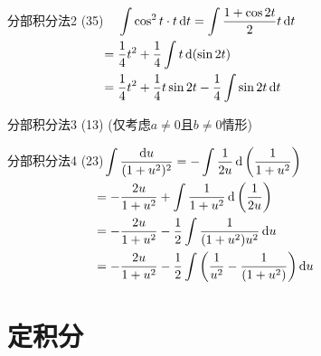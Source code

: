 \documentclass[14pt,notheorems,leqno,xcolor={rgb}]{beamer} %
\begin{document}
\begin{frame}{分部积分法2}
(35)\hspace{-1em}$\begin{aligned}[t]
&\int\cos^2 t \cdot t\dt = \int\frac{1+\cos 2t}2 t\dt \\ %
                                ={}& \frac14t^2 + \frac14\int t \d(\sin 2t) \\ %
                                ={}& \frac14t^2 + \frac14 t\sin 2t - \frac14 \int \sin 2t \dt
\end{aligned}$
\end{frame}

\begin{frame}{分部积分法3}
(13) (仅考虑$a\neq0$且$b\neq0$情形)\par
{}
\end{frame}

\begin{frame}{分部积分法4}
(23)$\hspace{-1em}\begin{aligned}[t]
  &\phantom{=}\int\frac{\du}{(1+u^2)^2} = -\int\frac1{2u}\d\left(\frac1{1+u^2}\right)\\
  &= -\frac{2u}{1+u^2}+\int \frac1{1+u^2} \d\left(\frac1{2u}\right)\\
  &= -\frac{2u}{1+u^2}-\frac12 \int \frac1{(1+u^2)u^2} \du \\
  &= -\frac{2u}{1+u^2}-\frac12 \int \left(\frac1{u^2}-\frac1{(1+u^2)}\right) \du
\end{aligned}$
\end{frame}

\section{定积分}
\end{document}
